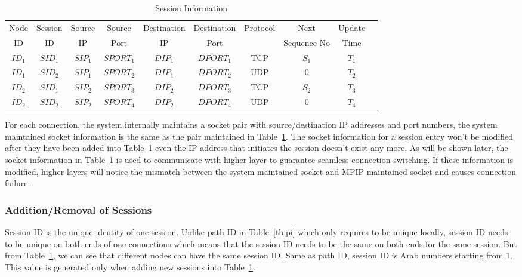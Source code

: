 \begin{table}
\caption{\label{tb.ss}Session Information}
\centering
\begin{tabular}{|c|c|c|c|c|c|c|c|c|c|}
\hline
Node  & Session &  Source &  Source & Destination & Destination & Protocol  &    Next      & Update     \\
  ID  &   ID    &    IP   &   Port  &     IP      &    Port     &           &  Sequence No &  Time    \\
\hline
${ID}_1$&${SID}_1$&${SIP}_{1}$&${SPORT}_{1}$&${DIP}_{1}$&${DPORT}_{1}$&TCP&$S_1$&$T_1$               \\
\hline
${ID}_1$&${SID}_2$&${SIP}_{1}$&${SPORT}_{2}$&${DIP}_{1}$&${DPORT}_{2}$&UDP&$0$&$T_2$                 \\
\hline
${ID}_2$&${SID}_1$&${SIP}_{2}$&${SPORT}_{3}$&${DIP}_{2}$&${DPORT}_{3}$&TCP&$S_2$&$T_3$              \\
\hline
${ID}_2$&${SID}_2$&${SIP}_{2}$&${SPORT}_{4}$&${DIP}_{2}$&${DPORT}_{4}$&UDP&$0$&$T_4$                 \\
\hline
\end{tabular}
\end{table}

For each connection, the system internally maintains a socket pair with source/destination IP addresses and port numbers, the system maintained socket information is the same as the pair maintained in Table~\ref{tb.ss}. The socket information for a session entry won't be modified after they have been added into Table~\ref{tb.ss} even the IP address that initiates the session doesn't exist any more. As will be shown later, the socket information in Table~\ref{tb.ss} is used to communicate with higher layer to guarantee seamless connection switching. If these information is modified, higher layers will notice the mismatch between the system maintained socket and MPIP maintained socket and causes connection failure.

\subsubsection{Addition/Removal of Sessions}

Session ID is the unique identity of one session. Unlike path ID in Table~\ref{tb.pi} which only requires to be unique locally, session ID needs to be unique on both ends of one connections which means that the session ID needs to be the same on both ends for the same session. But from Table~\ref{tb.ss}, we can see that different nodes can have the same session ID. Same as path ID, session ID is Arab numbers starting from $1$. This value is generated only when adding new sessions into Table~\ref{tb.ss}.

